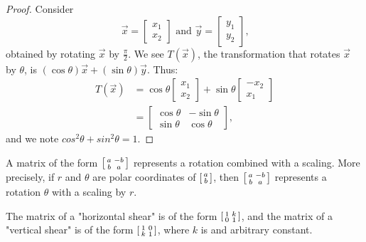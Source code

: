 \documentclass[a4paper,11pt]{article}
\begin{document}
\begin{outline}
    \begin{proof}
      Consider 
      \[
        \vec{x} = \begin{bmatrix} x_1 \\ x_2 \end{bmatrix} \text{ and }
        \vec{y} = \begin{bmatrix} y_1 \\ y_2 \end{bmatrix} \text{,}
      \]
      obtained by rotating \(\vec{x}\) by \(\frac{\pi}{2}\). We see \(T(\vec{x})\),
      the transformation that rotates \(\vec{x}\) by \(\theta\), is \((\cos{\theta})\vec{x} 
      + (\sin{\theta})\vec{y}\). Thus:
      \begin{align*}
        T(\vec{x}) &= \cos{\theta} \begin{bmatrix}  x_1 \\ x_2 \end{bmatrix} + 
                      \sin{\theta} \begin{bmatrix} -x_2 \\ x_1 \end{bmatrix} \\
                   &= \begin{bmatrix} 
                        \cos{\theta} & -\sin{\theta}           \\ 
                        \sin{\theta} &  \cos{\theta} 
                      \end{bmatrix}\text{,}
      \end{align*}
      and we note \(cos^2\theta + sin^2\theta = 1\).
    \end{proof}

    A matrix of the form \(\begin{bsmallmatrix} a & -b \\ b & a \end{bsmallmatrix}\) represents a rotation combined
    with a scaling. More precisely, if \(r\) and \(\theta\) are polar coordinates of \(\begin{bsmallmatrix}
    a \\ b \end{bsmallmatrix}\), then \(\begin{bsmallmatrix} a & -b \\ b & a \end{bsmallmatrix}\) represents a rotation
    \(\theta\) with a scaling by \(r\).
    
    The matrix of a "horizontal shear" is of the form \(\begin{bsmallmatrix} 1 & k \\ 0 & 1 \end{bsmallmatrix}\), and the
    matrix of a "vertical shear" is of the form \(\begin{bsmallmatrix} 1 & 0 \\ k & 1 \end{bsmallmatrix}\), where \(k\) is
    and arbitrary constant.
    

\end{outline}
\end{document}
